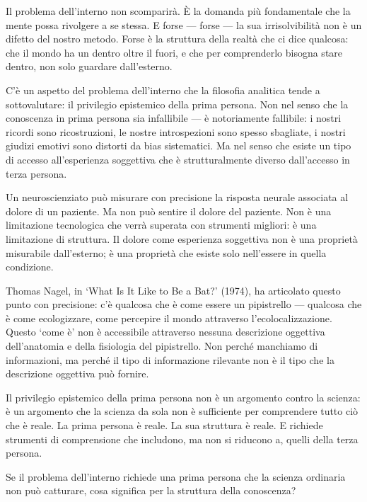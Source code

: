 \documentclass[12pt,a4paper,openany]{book}
\newcommand{\sezione}[1]{\vspace{1.2em}{\large\bfseries #1}\vspace{0.5em}\par}
\begin{document}
Il problema dell'interno non scomparirà. È la domanda più fondamentale che la mente possa rivolgere a se stessa. E forse — forse — la sua irrisolvibilità non è un difetto del nostro metodo. Forse è la struttura della realtà che ci dice qualcosa: che il mondo ha un dentro oltre il fuori, e che per comprenderlo bisogna stare dentro, non solo guardare dall'esterno.

\sezione{Il privilegio epistemico della prima persona}

C'è un aspetto del problema dell'interno che la filosofia analitica tende a sottovalutare: il privilegio epistemico della prima persona. Non nel senso che la conoscenza in prima persona sia infallibile --- è notoriamente fallibile: i nostri ricordi sono ricostruzioni, le nostre introspezioni sono spesso sbagliate, i nostri giudizi emotivi sono distorti da bias sistematici. Ma nel senso che esiste un tipo di accesso all'esperienza soggettiva che è strutturalmente diverso dall'accesso in terza persona.

Un neuroscienziato può misurare con precisione la risposta neurale associata al dolore di un paziente. Ma non può sentire il dolore del paziente. Non è una limitazione tecnologica che verrà superata con strumenti migliori: è una limitazione di struttura. Il dolore come esperienza soggettiva non è una proprietà misurabile dall'esterno; è una proprietà che esiste solo nell'essere in quella condizione.

Thomas Nagel, in `What Is It Like to Be a Bat?' (1974), ha articolato questo punto con precisione: c'è qualcosa che è come essere un pipistrello --- qualcosa che è come ecologizzare, come percepire il mondo attraverso l'ecolocalizzazione. Questo `come è' non è accessibile attraverso nessuna descrizione oggettiva dell'anatomia e della fisiologia del pipistrello. Non perché manchiamo di informazioni, ma perché il tipo di informazione rilevante non è il tipo che la descrizione oggettiva può fornire.

Il privilegio epistemico della prima persona non è un argomento contro la scienza: è un argomento che la scienza da sola non è sufficiente per comprendere tutto ciò che è reale. La prima persona è reale. La sua struttura è reale. E richiede strumenti di comprensione che includono, ma non si riducono a, quelli della terza persona.

\sezione{Verso una epistemologia integrata}

Se il problema dell'interno richiede una prima persona che la scienza ordinaria non può catturare, cosa significa per la struttura della conoscenza?
\end{document}
